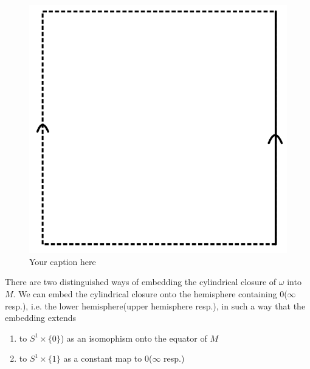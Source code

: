 \begin{figure}[H]
    \centering
    \includegraphics[scale = 0.95]{diagrams/natural_alternating_diagrams/3.png} 
    \caption{Your caption here}
    \label{fig:your-label}
\end{figure}

There are two distinguished ways of embedding the cylindrical closure of $\omega$ into $M$. We can embed the cylindrical closure onto the hemisphere containing $0$($\infty$ resp.), i.e. the lower hemisphere(upper hemisphere resp.), in such a way that the embedding extends

\begin{enumerate}[label = (\roman*)]
\item to $S^1 \times \{ 0 \}$) as an isomophism onto the equator of $M$
\item to  $S^1 \times \{ 1 \}$ as a constant map to $0$($\infty$ resp.)
\end{enumerate}

